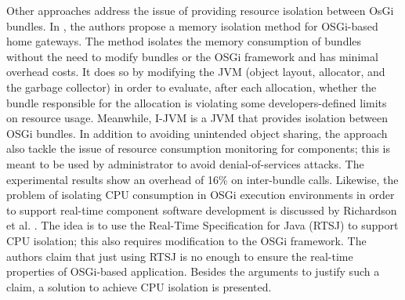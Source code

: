 Other approaches address the issue of providing resource isolation between OsGi bundles.
In \cite{Kuroda2014}, the authors propose a memory isolation method for OSGi-based home gateways.
The method isolates the memory consumption of bundles without the need to modify bundles or the OSGi framework and has minimal overhead costs.
It does so by modifying the JVM (object layout, allocator, and the garbage collector) in order to evaluate, after each allocation, whether the bundle responsible for the allocation is violating some developers-defined limits on resource usage.
Meanwhile, I-JVM \cite{dsn/09/geoffray/ijvm} is a JVM that provides isolation between OSGi bundles.
In addition to avoiding unintended object sharing, the approach also tackle the issue of resource consumption monitoring for components; this is meant to be used by administrator to avoid denial-of-services attacks.
The experimental results show an overhead of 16\% on inter-bundle calls.
Likewise, the problem of isolating CPU consumption in OSGi execution environments in order to support real-time component software development is discussed by Richardson et al. \cite{Richardson2009}.
The idea is to use the Real-Time Specification for Java (RTSJ) to support CPU isolation; this also requires modification to the OSGi framework.
The authors claim that just using RTSJ is no enough to ensure the real-time properties of OSGi-based application.
Besides the arguments to justify such a claim, a solution to achieve CPU isolation is presented.





